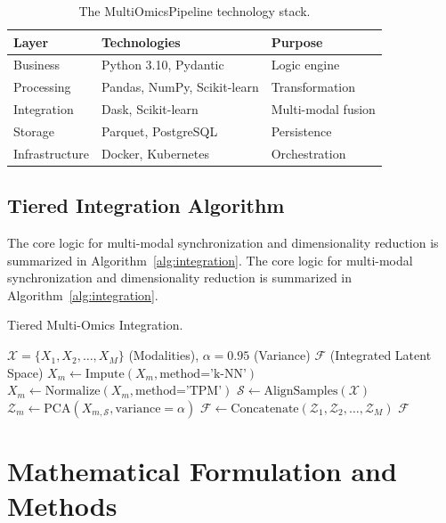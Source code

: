 \documentclass[runningheads]{llncs}
\begin{document}
\begin{table}[H]
\caption{The MultiOmicsPipeline technology stack.}\label{tab:stack}
\centering
\small
\setlength{\tabcolsep}{3pt}
\begin{tabularx}{\textwidth}{L L L}
\toprule
\textbf{Layer} & \textbf{Technologies} & \textbf{Purpose} \\
\midrule
Business        & Python 3.10, Pydantic & Logic engine \\
Processing      & Pandas, NumPy, Scikit-learn & Transformation \\
Integration     & Dask, Scikit-learn    & Multi-modal fusion \\
Storage         & Parquet, PostgreSQL   & Persistence \\
Infrastructure  & Docker, Kubernetes    & Orchestration \\
\bottomrule
\end{tabularx}
\end{table}

\subsection{Tiered Integration Algorithm}
The core logic for multi-modal synchronization and dimensionality reduction is summarized in Algorithm~\ref{alg:integration}.
The core logic for multi-modal synchronization and dimensionality reduction is summarized in Algorithm~\ref{alg:integration}.

\begin{algorithm}[H]
\caption{Tiered Multi-Omics Integration.}\label{alg:integration}
\begin{algorithmic}[1]
\REQUIRE $\mathcal{X} = \{X_1, X_2, \dots, X_M\}$ (Modalities), $\alpha = 0.95$ (Variance)
\ENSURE $\mathcal{F}$ (Integrated Latent Space)
    \STATE $X_m \gets \text{Impute}(X_m, \text{method='k-NN'})$
    \STATE $X_m \gets \text{Normalize}(X_m, \text{method='TPM'})$
\ENDFOR
\STATE $\mathcal{S} \gets \text{AlignSamples}(\mathcal{X})$
    \STATE $\mathcal{Z}_m \gets \text{PCA}(X_{m, \mathcal{S}}, \text{variance}=\alpha)$
\ENDFOR
\STATE $\mathcal{F} \gets \text{Concatenate}(\mathcal{Z}_1, \mathcal{Z}_2, \dots, \mathcal{Z}_M)$
\RETURN $\mathcal{F}$
\end{algorithmic}
\end{algorithm}

\section{Mathematical Formulation and Methods}
\end{document}
